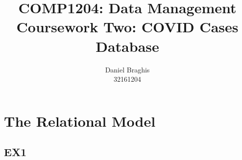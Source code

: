 \documentclass[12pt,oneside,a4paper,english]{article}
\begin{document}
\title{COMP1204: Data Management \\ Coursework Two: COVID Cases Database }
\author{Daniel Braghis \\ 32161204}
\maketitle

\maketitle

\section{The Relational Model}

\subsection{EX1}
\small
\end{document}
